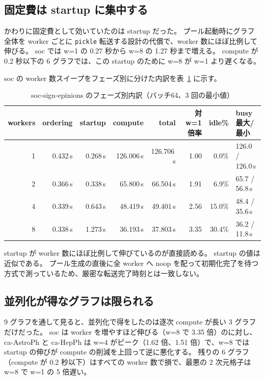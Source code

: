 \subsection{固定費は startup に集中する}

かわりに固定費として効いていたのは startup だった。
プール起動時にグラフ全体を worker ごとに \texttt{pickle} 転送する設計の代償で、worker 数にほぼ比例して伸びる。
soc では w=1 の 0.27 秒から w=8 の 1.27 秒まで増える。
compute が 0.2 秒以下の 6 グラフでは、この startup のために w=8 が w=1 より遅くなる。

soc の worker 数スイープをフェーズ別に分けた内訳を表~\ref{tab:phase-soc} に示す。

\begin{table}[htbp]
  \centering
  \caption{soc-sign-epinions のフェーズ別内訳（バッチ64、3 回の最小値）}
  \label{tab:phase-soc}
  \begin{tabular}{rrrrrrrl}
    \toprule
    workers & ordering & startup & compute & total & 対w=1倍率 & idle\% & busy 最大/最小 \\
    \midrule
    1 & 0.432\,s & 0.268\,s & 126.006\,s & 126.706\,s & 1.00 & 0.0\%  & 126.0 / 126.0\,s \\
    2 & 0.366\,s & 0.338\,s & 65.800\,s  & 66.504\,s  & 1.91 & 6.9\%  & 65.7 / 56.8\,s \\
    4 & 0.339\,s & 0.643\,s & 48.419\,s  & 49.401\,s  & 2.56 & 15.0\% & 48.4 / 35.6\,s \\
    8 & 0.338\,s & 1.273\,s & 36.193\,s  & 37.803\,s  & 3.35 & 30.4\% & 36.2 / 11.8\,s \\
    \bottomrule
  \end{tabular}
\end{table}

startup が worker 数にほぼ比例して伸びているのが直接読める。
startup の値は近似である。
プール生成の直後に全 worker へ noop を配って初期化完了を待つ方式で測っているため、厳密な転送完了時刻とは一致しない。

\subsection{並列化が得なグラフは限られる}

9 グラフを通して見ると、並列化で得をしたのは逐次 compute が長い 3 グラフだけだった。
soc は worker を増やすほど伸びる（w=8 で 3.35 倍）のに対し、ca-AstroPh と ca-HepPh は w=4 がピーク（1.62 倍、1.51 倍）で、w=8 では startup の伸びが compute の削減を上回って逆に悪化する。
残りの 6 グラフ（compute が 0.2 秒以下）はすべての worker 数で損で、最悪の 2 次元格子は w=8 で w=1 の 5 倍遅い。

